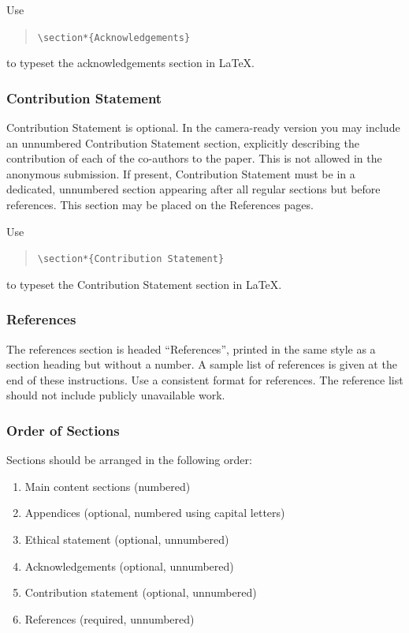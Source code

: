 \documentclass{article}
\begin{document}
Use
\begin{quote}
	{\tt \textbackslash{}section*\{Acknowledgements\}}
\end{quote}
to typeset the acknowledgements section in \LaTeX{}.


\subsubsection{Contribution Statement}

Contribution Statement is optional. In the camera-ready version you may include an unnumbered Contribution Statement section, explicitly describing the contribution of each of the co-authors to the paper. This is not allowed in the anonymous submission. If present, Contribution Statement must be in a dedicated, unnumbered section appearing after all regular sections but before references.  This section may be placed on the References pages.

Use
\begin{quote}
	{\tt \textbackslash{}section*\{Contribution Statement\}}
\end{quote}
to typeset the Contribution Statement section in \LaTeX{}.

\subsubsection{References}

The references section is headed ``References'', printed in the same
style as a section heading but without a number. A sample list of
references is given at the end of these instructions. Use a consistent
format for references. The reference list should not include publicly unavailable work.

\subsubsection{Order of Sections}
Sections should be arranged in the following order:
\begin{enumerate}
	\item Main content sections (numbered)
	\item Appendices (optional, numbered using capital letters)
	\item Ethical statement (optional, unnumbered)
	\item Acknowledgements (optional, unnumbered)
	\item Contribution statement (optional, unnumbered)
	\item References (required, unnumbered)
\end{enumerate}
\end{document}
